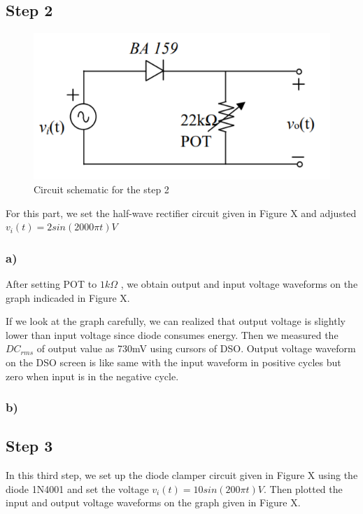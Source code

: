\documentclass[letterpaper,12pt]{article}
\begin{document}
\subsection{Step 2}

\begin{figure}[H]
    \centering
    \includegraphics[width=1\textwidth]{2_1.png}
    \caption{Circuit schematic for the step 2}
\end{figure} 
For this part, we set the half-wave rectifier circuit given in Figure X and adjusted 
\(
v_i(t)  = 2sin(2000 \pi t) V 
\)


\subsubsection{a)}
After setting POT to \(1k\Omega\) , we obtain output and input voltage waveforms on the graph indicaded in Figure X.


If we look at the graph carefully, we can realized that output voltage is slightly lower than input voltage since diode consumes energy. Then we measured the \(DC_{rms} \) of output value as 730mV using cursors of DSO. Output voltage waveform on the DSO screen is like same with the input waveform in positive cycles but zero when input is in the negative cycle.  


\subsubsection{b)}


\subsection{Step 3}

In this third step, we set up the diode clamper circuit given in Figure X using the diode 1N4001 and set the voltage \(v_i(t) = 10sin(200\pi t) V\). Then plotted the input and output voltage waveforms on the graph given in Figure X.
\end{document}
